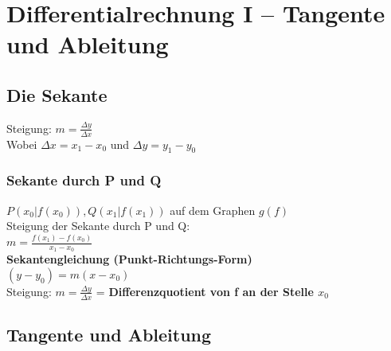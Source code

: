 \documentclass[../main.tex]{subfiles}
\begin{document}

\chapter{Differentialrechnung I -- Tangente und Ableitung}
\section{Die Sekante}
Steigung: $m = \frac{\Delta y}{\Delta x}$ \\ [7pt]
Wobei $\Delta x = x_1 - x_0$ und $\Delta y = y_1 - y_0$

\subsection{Sekante durch P und Q}
$P(x_0|f(x_0)), Q(x_1|f(x_1))$ auf dem Graphen $g(f)$ \\ [7pt]
Steigung der Sekante durch P und Q: \\ [7pt]
$m = \frac{f(x_1)-f(x_0)}{x_1 - x_0}$ \\ [7pt]
\textbf{Sekantengleichung (Punkt-Richtungs-Form)} \\ [7pt]
$(y - y_0) = m(x - x_0)$ \\ [7pt]
Steigung: $m = \frac{\Delta y}{\Delta x}$ = \textbf{Differenzquotient von f an der Stelle $x_0$}

\section{Tangente und Ableitung}
\end{document}
